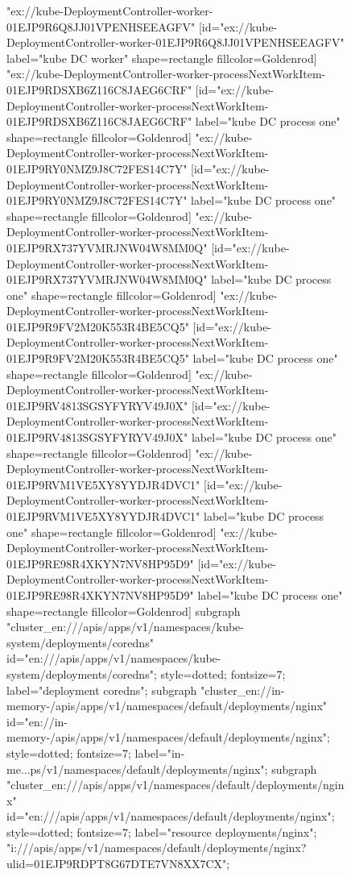 \begin{figure}[p]
\begin{sideways}
{"ex://kube-DeploymentController-worker-01EJP9R6Q8JJ01VPENHSEEAGFV" [id="ex://kube-DeploymentController-worker-01EJP9R6Q8JJ01VPENHSEEAGFV" label="kube DC worker" shape=rectangle fillcolor=Goldenrod]
"ex://kube-DeploymentController-worker-processNextWorkItem-01EJP9RDSXB6Z116C8JAEG6CRF" [id="ex://kube-DeploymentController-worker-processNextWorkItem-01EJP9RDSXB6Z116C8JAEG6CRF" label="kube DC process one" shape=rectangle fillcolor=Goldenrod]
"ex://kube-DeploymentController-worker-processNextWorkItem-01EJP9RY0NMZ9J8C72FES14C7Y" [id="ex://kube-DeploymentController-worker-processNextWorkItem-01EJP9RY0NMZ9J8C72FES14C7Y" label="kube DC process one" shape=rectangle fillcolor=Goldenrod]
"ex://kube-DeploymentController-worker-processNextWorkItem-01EJP9RX737YVMRJNW04W8MM0Q" [id="ex://kube-DeploymentController-worker-processNextWorkItem-01EJP9RX737YVMRJNW04W8MM0Q" label="kube DC process one" shape=rectangle fillcolor=Goldenrod]
"ex://kube-DeploymentController-worker-processNextWorkItem-01EJP9R9FV2M20K553R4BE5CQ5" [id="ex://kube-DeploymentController-worker-processNextWorkItem-01EJP9R9FV2M20K553R4BE5CQ5" label="kube DC process one" shape=rectangle fillcolor=Goldenrod]
"ex://kube-DeploymentController-worker-processNextWorkItem-01EJP9RV4813SGSYFYRYV49J0X" [id="ex://kube-DeploymentController-worker-processNextWorkItem-01EJP9RV4813SGSYFYRYV49J0X" label="kube DC process one" shape=rectangle fillcolor=Goldenrod]
"ex://kube-DeploymentController-worker-processNextWorkItem-01EJP9RVM1VE5XY8YYDJR4DVC1" [id="ex://kube-DeploymentController-worker-processNextWorkItem-01EJP9RVM1VE5XY8YYDJR4DVC1" label="kube DC process one" shape=rectangle fillcolor=Goldenrod]
"ex://kube-DeploymentController-worker-processNextWorkItem-01EJP9RE98R4XKYN7NV8HP95D9" [id="ex://kube-DeploymentController-worker-processNextWorkItem-01EJP9RE98R4XKYN7NV8HP95D9" label="kube DC process one" shape=rectangle fillcolor=Goldenrod]
subgraph "cluster_en:///apis/apps/v1/namespaces/kube-system/deployments/coredns" {
id="en:///apis/apps/v1/namespaces/kube-system/deployments/coredns";
style=dotted;
fontsize=7;
label="deployment coredns";
}
subgraph "cluster_en://in-memory-/apis/apps/v1/namespaces/default/deployments/nginx" {
id="en://in-memory-/apis/apps/v1/namespaces/default/deployments/nginx";
style=dotted;
fontsize=7;
label="in-me...ps/v1/namespaces/default/deployments/nginx";
}
subgraph "cluster_en:///apis/apps/v1/namespaces/default/deployments/nginx" {
id="en:///apis/apps/v1/namespaces/default/deployments/nginx";
style=dotted;
fontsize=7;
label="resource deployments/nginx";
"i:///apis/apps/v1/namespaces/default/deployments/nginx?ulid=01EJP9RDPT8G67DTE7VN8XX7CX";
}}
\end{sideways}
\end{figure}
